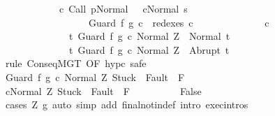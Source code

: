 \begin{isabellebody}
\ \ \ \ \ \ \ \ \ \ \ \ {\isacharparenleft}{\isasymexists}c{\isacharprime}{\isachardot}\ {\isasymGamma}{\isasymturnstile}{\isacharparenleft}Call\ p{\isacharcomma}Normal\ {\isasymsigma}{\isacharparenright}\ {\isasymrightarrow}\isactrlsup {\isacharplus}\ {\isacharparenleft}c{\isacharprime}{\isacharcomma}Normal\ s{\isacharparenright}\ {\isasymand}\isanewline
\ \ \ \ \ \ \ \ \ \ \ \ \ \ \ \ \ \ Guard\ f\ g\ c\ {\isasymin}\ redexes\ c{\isacharprime}{\isacharparenright}{\isacharbraceright}{\isacharparenright}\isanewline
\ \ \ \ \ \ \ \ \ \ \ \ \ \ c\ \ \isanewline
\ \ \ \ \ \ \ \ \ \ \ \ \ \ {\isacharbraceleft}t{\isachardot}\ {\isasymGamma}{\isasymturnstile}{\isasymlangle}Guard\ f\ g\ c\ {\isacharcomma}Normal\ Z{\isasymrangle}\ {\isasymRightarrow}\ Normal\ t{\isacharbraceright}{\isacharcomma}\isanewline
\ \ \ \ \ \ \ \ \ \ \ \ \ \ {\isacharbraceleft}t{\isachardot}\ {\isasymGamma}{\isasymturnstile}{\isasymlangle}Guard\ f\ g\ c\ {\isacharcomma}Normal\ Z{\isasymrangle}\ {\isasymRightarrow}\ Abrupt\ t{\isacharbraceright}{\isachardoublequoteclose}\isanewline
\ \ \ \ \isamarkupfalse%
\ {\isacharparenleft}rule\ ConseqMGT\ {\isacharbrackleft}OF\ hyp{\isacharunderscore}c{\isacharbrackright}{\isacharcomma}\ safe{\isacharparenright}\isanewline
\ \ \ \ \ \ \isamarkupfalse%
\ {\isachardoublequoteopen}{\isasymGamma}{\isasymturnstile}{\isasymlangle}Guard\ f\ g\ c\ {\isacharcomma}Normal\ Z{\isasymrangle}\ {\isasymRightarrow}{\isasymnotin}{\isacharparenleft}{\isacharbraceleft}Stuck{\isacharbraceright}\ {\isasymunion}\ Fault\ {\isacharbackquote}\ {\isacharparenleft}{\isacharminus}F{\isacharparenright}{\isacharparenright}{\isachardoublequoteclose}\ \isanewline
\ \ \ \ \ \ \isamarkupfalse%
\ {\isachardoublequoteopen}{\isasymGamma}{\isasymturnstile}{\isasymlangle}c{\isacharcomma}Normal\ Z{\isasymrangle}\ {\isasymRightarrow}{\isasymnotin}{\isacharparenleft}{\isacharbraceleft}Stuck{\isacharbraceright}\ {\isasymunion}\ Fault\ {\isacharbackquote}\ {\isacharparenleft}{\isacharminus}F{\isacharparenright}{\isacharparenright}{\isachardoublequoteclose}\isanewline
\ \ \ \ \ \ \ \ \isamarkupfalse%
\ False\isanewline
\ \ \ \ \ \ \ \ \isamarkupfalse%
\ {\isacharparenleft}cases\ {\isachardoublequoteopen}Z{\isasymin}\ g{\isachardoublequoteclose}{\isacharparenright}\ {\isacharparenleft}auto\ simp\ add{\isacharcolon}\ final{\isacharunderscore}notin{\isacharunderscore}def\ intro{\isacharcolon}\ exec{\isachardot}intros{\isacharparenright}\isanewline
\ \ \ \ \isamarkupfalse%
\isanewline
\ \ \ \ \ \ \isamarkupfalse%

\end{isabellebody}
